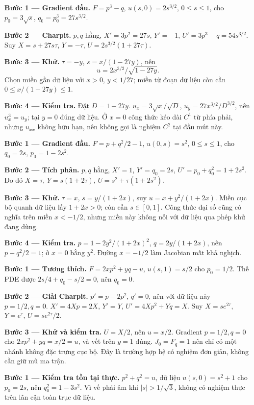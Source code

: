 \textbf{Bước 1 — Gradient đầu.} $F=p^3-q$, $u(s,0)=2s^{3/2}$, $0\le s\le1$, cho $p_0=3\sqrt s$, $q_0=p_0^3=27s^{3/2}$.

\textbf{Bước 2 — Charpit.} $p,q$ hằng, $X'=3p^2=27s$, $Y'=-1$, $U'=3p^3-q=54s^{3/2}$. Suy $X=s+27s\tau$, $Y=-\tau$, $U=2s^{3/2}(1+27\tau)$.

\textbf{Bước 3 — Khử.} $\tau=-y$, $s=x/(1-27y)$, nên
\[u=2x^{3/2}/\sqrt{1-27y}.\]
Chọn miền gần dữ liệu với $x>0$, $y<1/27$; miền từ đoạn dữ liệu còn cần $0\le x/(1-27y)\le1$.

\textbf{Bước 4 — Kiểm tra.} Đặt $D=1-27y$. $u_x=3\sqrt{x}/\sqrt D$, $u_y=27x^{3/2}/D^{3/2}$, nên $u_x^3=u_y$; tại $y=0$ đúng dữ liệu. Ở $x=0$ công thức kéo dài $C^1$ từ phía phải, nhưng $u_{xx}$ không hữu hạn, nên không gọi là nghiệm $C^2$ tại đầu mút này.

\textbf{Bước 1 — Gradient đầu.} $F=p+q^2/2-1$, $u(0,s)=s^2$, $0\le s\le1$, cho $q_0=2s$, $p_0=1-2s^2$.

\textbf{Bước 2 — Tích phân.} $p,q$ hằng, $X'=1$, $Y'=q_0=2s$, $U'=p_0+q_0^2=1+2s^2$. Do đó $X=\tau$, $Y=s(1+2\tau)$, $U=s^2+\tau(1+2s^2)$.

\textbf{Bước 3 — Khử.} $\tau=x$, $s=y/(1+2x)$, suy $u=x+y^2/(1+2x)$. Miền cục bộ quanh dữ liệu lấy $1+2x>0$; còn cần $s\in[0,1]$. Công thức đại số cũng có nghĩa trên miền $x<-1/2$, nhưng miền này không nối với dữ liệu qua phép khử đang dùng.

\textbf{Bước 4 — Kiểm tra.} $p=1-2y^2/(1+2x)^2$, $q=2y/(1+2x)$, nên $p+q^2/2=1$; ở $x=0$ bằng $y^2$. Đường $x=-1/2$ làm Jacobian mất khả nghịch.

\textbf{Bước 1 — Tương thích.} $F=2xp^2+yq-u$, $u(s,1)=s/2$ cho $p_0=1/2$. Thế PDE được $2s/4+q_0-s/2=0$, nên $q_0=0$.

\textbf{Bước 2 — Giải Charpit.} $p'=p-2p^2$, $q'=0$, nên với dữ liệu này $p=1/2,q=0$. $X'=4Xp=2X$, $Y'=Y$, $U'=4Xp^2+Yq=X$. Suy $X=se^{2\tau}$, $Y=e^\tau$, $U=se^{2\tau}/2$.

\textbf{Bước 3 — Khử và kiểm tra.} $U=X/2$, nên $u=x/2$. Gradient $p=1/2,q=0$ cho $2xp^2+yq=x/2=u$, và vết trên $y=1$ đúng. $J_0=F_q=1$ nên chỉ có một nhánh không đặc trưng cục bộ. Đây là trường hợp hệ có nghiệm đơn giản, không cần giữ mũ ma trận.

\textbf{Bước 1 — Kiểm tra tồn tại thực.} $p^2+q^2=u$, dữ liệu $u(s,0)=s^2+1$ cho $p_0=2s$, nên $q_0^2=1-3s^2$. Vì vế phải âm khi $|s|>1/\sqrt3$, không có nghiệm thực trên lân cận toàn trục dữ liệu.

